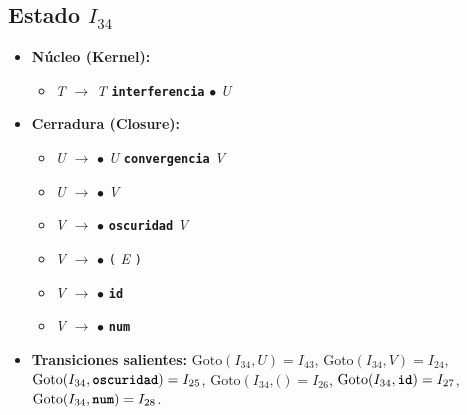 \documentclass[12pt, letterpaper]{article}
\begin{document}
\subsection*{Estado $I_{34}$ }
\begin{itemize}\setlength{\itemsep}{1pt}\setlength{\parskip}{0pt}
\item \textbf{Núcleo (Kernel):}
\begin{itemize}\setlength{\itemsep}{1pt}\setlength{\parskip}{0pt}
    \item \textit{T} $\to$ \textit{T} \textbf{\texttt{interferencia}} $\bullet$ \textit{U}
\end{itemize}
\item \textbf{Cerradura (Closure):}
\begin{itemize}\setlength{\itemsep}{1pt}\setlength{\parskip}{0pt}
    \item \textit{U} $\to$ $\bullet$ \textit{U} \textbf{\texttt{convergencia}} \textit{V}
    \item \textit{U} $\to$ $\bullet$ \textit{V}
    \item \textit{V} $\to$ $\bullet$ \textbf{\texttt{oscuridad}} \textit{V}
    \item \textit{V} $\to$ $\bullet$ \texttt{(} \textit{E} \texttt{)}
    \item \textit{V} $\to$ $\bullet$ \textbf{\texttt{id}}
    \item \textit{V} $\to$ $\bullet$ \textbf{\texttt{num}}
\end{itemize}
\item \textbf{Transiciones salientes:} $\text{Goto}(I_{34}, \textit{U}) = I_{43}$, \quad $\text{Goto}(I_{34}, \textit{V}) = I_{24}$, \quad $\text{Goto}(I_{34}, \textbf{\texttt{oscuridad}}) = I_{25}$, \quad $\text{Goto}(I_{34}, \texttt{(}) = I_{26}$, \quad $\text{Goto}(I_{34}, \textbf{\texttt{id}}) = I_{27}$, \quad $\text{Goto}(I_{34}, \textbf{\texttt{num}}) = I_{28}$.
\end{itemize}
\vspace{2pt}
\end{document}
